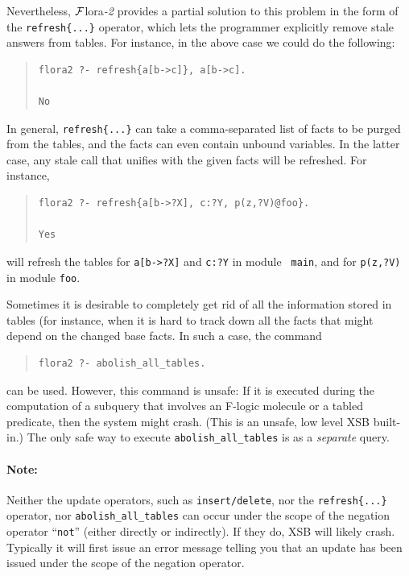 \documentclass[11pt]{article}
\newcommand{\FLORA}{{\mbox{\sc ${\cal F}${lora}\rm\emph{-2}}}\xspace}
\newcommand{\fl}{\mbox{F-logic}\xspace}
\newcommand{\TNOT}{{{\tt not}}\xspace}
\begin{document}
Nevertheless, \FLORA provides a partial solution to this problem in the form
of the {\tt refresh\{...\}} operator, which lets the programmer explicitly
remove stale answers from tables. For instance, in the above case we could
do the following:
\begin{quote}
\begin{verbatim}
flora2 ?- refresh{a[b->c]}, a[b->c].

No
\end{verbatim}
\end{quote}
In general, {\tt refresh\{...\}} can take a comma-separated list of facts to
be purged from the tables, and the facts can even contain unbound variables.
In the latter case, any stale call that unifies with the given facts will
be refreshed. For instance,
\begin{quote}
\begin{verbatim}
flora2 ?- refresh{a[b->?X], c:?Y, p(z,?V)@foo}.

Yes
\end{verbatim}
\end{quote}
will refresh the tables for {\tt a[b->?X]} and {\tt c:?Y} in module {\tt
  main}, and for {\tt p(z,?V)} in module {\tt foo}.

Sometimes it is desirable to completely get rid of all the information
stored in tables (for instance, when it is hard to track down all the facts
that might depend on the changed base facts. In such a case, the command
\begin{quote}
\begin{verbatim}
flora2 ?- abolish_all_tables.
\end{verbatim}
\end{quote}
can be used. However, this command is unsafe: If it is executed during the
computation of a subquery that involves an \fl molecule or a tabled
predicate, then the system might crash. (This is an unsafe, low level XSB
built-in.)  The only safe way to execute {\tt abolish\_all\_tables} is as a
\emph{separate} query.

\paragraph{Note:} Neither the update operators, such as  {\tt {\tt insert}/delete},
nor the {\tt refresh\{...\}} operator, nor {\tt abolish\_all\_tables}
can occur under the scope of the negation operator ``\TNOT'' (either
directly or indirectly). If they do, XSB will likely crash. Typically it
will first issue an error message telling you that an update has been
issued under the scope of the negation operator.
\end{document}
